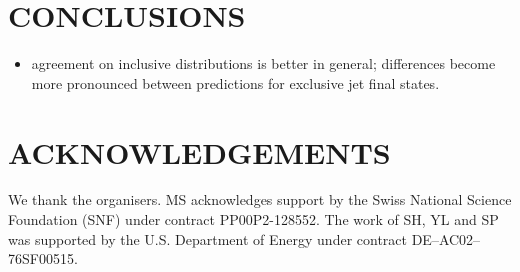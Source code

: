 \section{CONCLUSIONS}
\label{sec:hjetscomp:conclusions}


\begin{itemize}
\item agreement on inclusive distributions is better in general;
  differences become more pronounced between predictions for exclusive
  jet final states. 
\end{itemize}


\section*{ACKNOWLEDGEMENTS}

We thank the organisers.
MS acknowledges support by the Swiss National Science Foundation (SNF) 
under contract PP00P2-128552. 
The work of SH, YL and SP was supported by the U.S. Department of Energy 
under contract DE--AC02--76SF00515.
